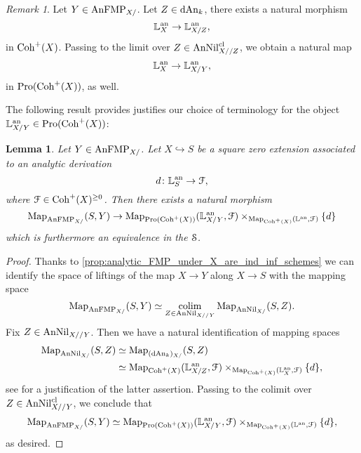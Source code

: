 \documentclass[10pt,a4paper,reqno]{amsart} %
\theoremstyle{plain}
\newtheorem{lem}[thm]{Lemma}
\theoremstyle{definition}
\theoremstyle{remark}
\newtheorem{rem}[thm]{Remark}
\numberwithin{equation}{section}
\begin{document}
\begin{rem}
    Let $Y \in \mathrm{AnFMP}_{X/}$. Let $Z \in \mathrm{dAn}_k$, there exists a natural morphism
        \[
            \mathbb L^\mathrm{an}_X \to \mathbb L^\mathrm{an}_{X/Z} ,  
        \]
    in $\mathrm{Coh}^+(X)$. Passing to the limit over $Z \in \mathrm{AnNil}^{\mathrm{cl}}_{X//Z}$, we obtain a natural map
        \[
            \mathbb L^\mathrm{an}_X \to \mathbb L^\mathrm{an}_{X/Y},  
        \]
    in $\mathrm{Pro}(\mathrm{Coh}^+(X))$, as well.
\end{rem}

The following result provides justifies our choice of terminology for the object $\mathbb L^\mathrm{an}_{X/Y} \in \mathrm{Pro}(\mathrm{Coh}^+(X))$:

\begin{lem} \label{lem:pro_cot_complex_classifies_nil_extensions_for_analytic_moduli_problems}
    Let $Y \in \mathrm{AnFMP}_{X/}$. Let $X \hookrightarrow S$ be a square zero extension associated to an analytic derivation
        \[
            d \colon \mathbb L^\mathrm{an}_S \to \mathcal F ,  
        \]
    where $\mathcal F \in \mathrm{Coh}^+(X)^{\ge 0}$. Then there exists a natural morphism
        \[
            \operatorname{Map}_{\mathrm{AnFMP}_{X/}}(S, Y) \to \operatorname{Map}_{\mathrm{Pro}(\mathrm{Coh}^+(X))}(\mathbb L^\mathrm{an}_{X/Y}, \mathcal F) \times_{\operatorname{Map}_{\mathrm{Coh}^+(X)}(\mathbb L^\mathrm{an}, \mathcal F)} \{ d \}
        \]
    which is furthermore an equivalence in the \infcat $\mathcal S$.
\end{lem}

\begin{proof}
    Thanks to \cref{prop:analytic_FMP_under_X_are_ind_inf_schemes} we can identify the space of liftings of the map $X \to Y$ along $X \to S$ with the mapping space
        \[
            \operatorname{Map}_{\mathrm{AnFMP}_{X/}}(S, Y) \simeq \operatorname*{colim}_{Z \in \mathrm{AnNil}_{X//Y}} \operatorname{Map}_{\mathrm{AnNil}_{X/}} (S, Z).  
        \]
    Fix $Z \in \mathrm{AnNil}_{X//Y}$. Then we have a natural identification of mapping spaces
        \begin{align} \label{eq:identification_of_universal_property_of_rel_an_cotagent_complex}
            \operatorname{Map}_{\mathrm{AnNil}_{X/}} (S, Z) & \simeq \operatorname{Map}_{(\mathrm{dAn}_k)_{X/}} (S, Z) \\
                                      & \simeq \operatorname{Map}_{\mathrm{Coh}^+(X)}(\mathbb L^\mathrm{an}_{X/Z}, \mathcal F) \times_{\operatorname{Map}_{\mathrm{Coh}^+(X)}(\mathbb L^\mathrm{an}_X, \mathcal F)} \{ d \},
        \end{align}
    see \cite[\S 5.4]{Porta_Yu_Representability} for a justification of the latter assertion.
    Passing to the colimit over $Z \in \mathrm{AnNil}_{X//Y}^{\mathrm{cl}}$, we conclude that
        \[
            \operatorname{Map}_{\mathrm{AnFMP}_{X/}}(S, Y) \simeq \operatorname{Map}_{\mathrm{Pro}(\mathrm{Coh}^+(X))}(\mathbb L^\mathrm{an}_{X/Y}, \mathcal F) \times_{\operatorname{Map}_{\mathrm{Coh}^+(X)}(\mathbb L^\mathrm{an}, \mathcal F)} \{ d \},
        \]
    as desired.
\end{proof}
\end{document}
